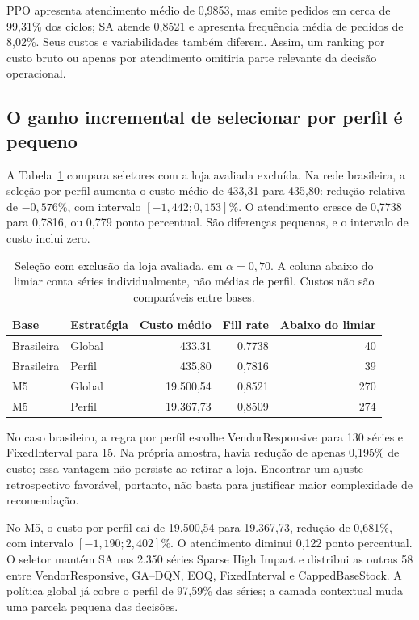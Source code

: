 \documentclass[preprint,12pt]{elsarticle}
\begin{document}
PPO apresenta atendimento médio de 0,9853, mas emite pedidos em cerca de 99,31\% dos ciclos; SA atende 0,8521 e apresenta frequência média de pedidos de 8,02\%. Seus custos e variabilidades também diferem. Assim, um ranking por custo bruto ou apenas por atendimento omitiria parte relevante da decisão operacional.

\subsection{O ganho incremental de selecionar por perfil é pequeno}
A Tabela~\ref{tab:strategies} compara seletores com a loja avaliada excluída. Na rede brasileira, a seleção por perfil aumenta o custo médio de 433,31 para 435,80: redução relativa de $-0{,}576\%$, com intervalo $[-1{,}442;0{,}153]\%$. O atendimento cresce de 0,7738 para 0,7816, ou 0,779 ponto percentual. São diferenças pequenas, e o intervalo de custo inclui zero.

\begin{table}[htbp]
\centering\small
\caption{Seleção com exclusão da loja avaliada, em $\alpha=0{,}70$. A coluna abaixo do limiar conta séries individualmente, não médias de perfil. Custos não são comparáveis entre bases.}\label{tab:strategies}
\begin{tabular}{llrrr}
\toprule
Base & Estratégia & Custo médio & Fill rate & Abaixo do limiar\\
\midrule
Brasileira & Global & 433,31 & 0,7738 & 40\\
Brasileira & Perfil & 435,80 & 0,7816 & 39\\
M5 & Global & 19.500,54 & 0,8521 & 270\\
M5 & Perfil & 19.367,73 & 0,8509 & 274\\
\bottomrule
\end{tabular}
\end{table}

No caso brasileiro, a regra por perfil escolhe VendorResponsive para 130 séries e FixedInterval para 15. Na própria amostra, havia redução de apenas 0,195\% de custo; essa vantagem não persiste ao retirar a loja. Encontrar um ajuste retrospectivo favorável, portanto, não basta para justificar maior complexidade de recomendação.

No M5, o custo por perfil cai de 19.500,54 para 19.367,73, redução de 0,681\%, com intervalo $[-1{,}190;2{,}402]\%$. O atendimento diminui 0,122 ponto percentual. O seletor mantém SA nas 2.350 séries Sparse High Impact e distribui as outras 58 entre VendorResponsive, GA--DQN, EOQ, FixedInterval e CappedBaseStock. A política global já cobre o perfil de 97,59\% das séries; a camada contextual muda uma parcela pequena das decisões.
\end{document}
